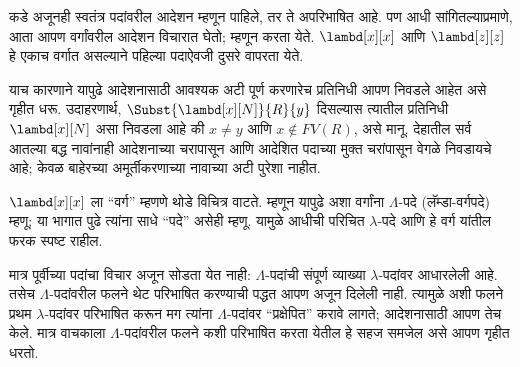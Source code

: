 \documentclass[../../../include/open-logic-section]{subfiles}
\begin{document}
 कडे अजूनही स्वतंत्र पदांवरील आदेशन म्हणून
पाहिले, तर ते अपरिभाषित आहे. पण आधी सांगितल्याप्रमाणे,
आता आपण वर्गांवरील आदेशन विचारात घेतो; म्हणून
 करता येते. $\lambd[x][x]$ आणि
$\lambd[z][z]$ हे एकाच वर्गात असल्याने पहिल्या
पदाऐवजी दुसरे वापरता येते.

याच कारणाने यापुढे आदेशनासाठी आवश्यक अटी पूर्ण
करणारेच प्रतिनिधी आपण निवडले आहेत असे गृहीत धरू.
उदाहरणार्थ, $\Subst{\lambd[x][N]}{R}{y}$ दिसल्यास
त्यातील प्रतिनिधी $\lambd[x][N]$ असा निवडला आहे की
$x \neq y$ आणि $x \notin FV(R)$, असे मानू.
देहातील सर्व आतल्या बद्ध नावांनाही आदेशनाच्या चरापासून
आणि आदेशित पदाच्या मुक्त चरांपासून वेगळे निवडायचे आहे;
केवळ बाहेरच्या अमूर्तीकरणाच्या नावाच्या अटी पुरेशा नाहीत.

$\lambd[x][x]$ ला ``वर्ग'' म्हणणे थोडे विचित्र वाटते.
म्हणून यापुढे अशा वर्गांना $\Lambda$-पदे (लॅम्डा-वर्गपदे)
म्हणू; या भागात पुढे त्यांना साधे ``पदे'' असेही म्हणू.
यामुळे आधीची परिचित $\lambda$-पदे आणि हे वर्ग
यांतील फरक स्पष्ट राहील.

\begin{editorial}
  मात्र पूर्वीच्या पदांचा विचार अजून सोडता येत नाही:
  $\Lambda$-पदांची संपूर्ण व्याख्या $\lambda$-पदांवर
  आधारलेली आहे. तसेच $\Lambda$-पदांवरील फलने थेट
  परिभाषित करण्याची पद्धत आपण अजून दिलेली नाही.
  त्यामुळे अशी फलने प्रथम $\lambda$-पदांवर परिभाषित
  करून मग त्यांना $\Lambda$-पदांवर ``प्रक्षेपित'' करावे
  लागते; आदेशनासाठी आपण तेच केले. मात्र वाचकाला
  $\Lambda$-पदांवरील फलने कशी परिभाषित करता येतील
  हे सहज समजेल असे आपण गृहीत धरतो.
\end{editorial}
\end{document}
